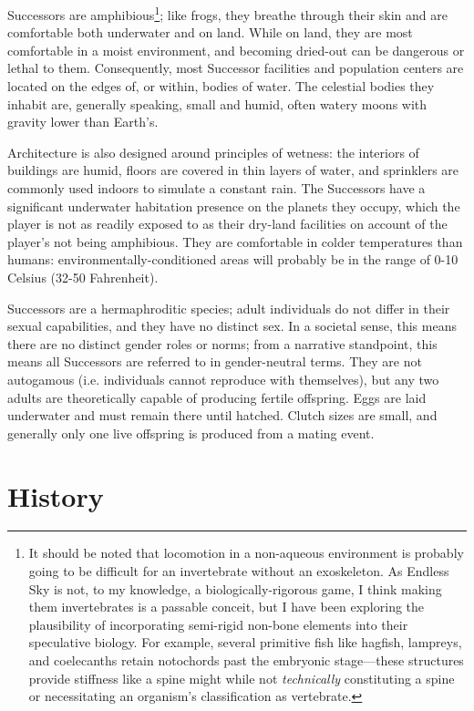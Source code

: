 \documentclass[11pt]{report}
\begin{document}
    Successors are amphibious\footnote{It should be noted that locomotion in a non-aqueous environment is probably going to be difficult for an invertebrate without an exoskeleton. As Endless Sky is not, to my knowledge, a biologically-rigorous game, I think making them invertebrates is a passable conceit, but I have been exploring the plausibility of incorporating semi-rigid non-bone elements into their speculative biology. For example, several primitive fish like hagfish, lampreys, and coelecanths retain notochords past the embryonic stage---these structures provide stiffness like a spine might while not \emph{technically} constituting a spine or necessitating an organism's classification as vertebrate.}; like frogs, they breathe through their skin and are comfortable both underwater and on land. While on land, they are most comfortable in a moist environment, and becoming dried-out can be dangerous or lethal to them. Consequently, most Successor facilities and population centers are located on the edges of, or within, bodies of water. The celestial bodies they inhabit are, generally speaking, small and humid, often watery moons with gravity lower than Earth's.
    
    Architecture is also designed around principles of wetness: the interiors of buildings are humid, floors are covered in thin layers of water, and sprinklers are commonly used indoors to simulate a constant rain. The Successors have a significant underwater habitation presence on the planets they occupy, which the player is not as readily exposed to as their dry-land facilities on account of the player's not being amphibious. They are comfortable in colder temperatures than humans: environmentally-conditioned areas will probably be in the range of 0-10 Celsius (32-50 Fahrenheit).
    
    Successors are a hermaphroditic species; adult individuals do not differ in their sexual capabilities, and they have no distinct sex. In a societal sense, this means there are no distinct gender roles or norms; from a narrative standpoint, this means all Successors are referred to in gender-neutral terms. They are not autogamous (i.e. individuals cannot reproduce with themselves), but any two adults are theoretically capable of producing fertile offspring. Eggs are laid underwater and must remain there until hatched. Clutch sizes are small, and generally only one live offspring is produced from a mating event.

    \section{History}
\end{document}
